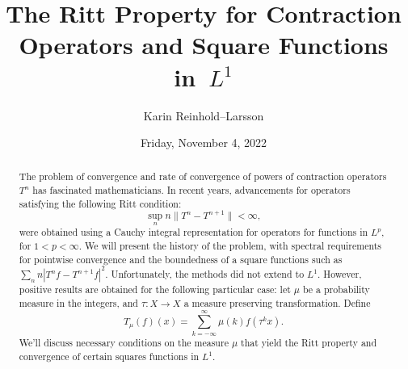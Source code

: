 \documentclass[colloquium]{UAmathtalk}
\author{Karin Reinhold--Larsson}
\title{The Ritt Property for Contraction Operators and Square Functions in~$L^1$}
\date{Friday, November 4, 2022}
\begin{document}
\maketitle

\begin{abstract}
The problem of convergence and rate of convergence of powers of contraction operators $T^n$  has fascinated mathematicians. 
In recent years, advancements  for operators satisfying the following Ritt condition: \[\sup_n n \|T^n-T^{n+1}\|<\infty,\] 
 were obtained using a Cauchy integral representation for operators for functions in $L^p$, 
 for $1<p<\infty$.   We will present the history of the problem, with spectral requirements for pointwise convergence and the boundedness of a square functions such as  $\sum_n n |T^nf-T^{n+1}f|^2$. 
Unfortunately, the methods did not extend to $L^1$. However, positive results are obtained for the following particular case:
let  $\mu$ be a probability measure in the integers, and  $\tau:X \to X$  a measure preserving transformation. 
Define \[T_{\mu} (f)(x)= \sum_{k=-\infty}^{\infty} \mu(k) f(\tau^k x).\] 
We'll discuss necessary conditions on the measure $\mu$ that yield the Ritt property and convergence of certain squares functions in $L^1$.
\end{abstract}
\end{document}
